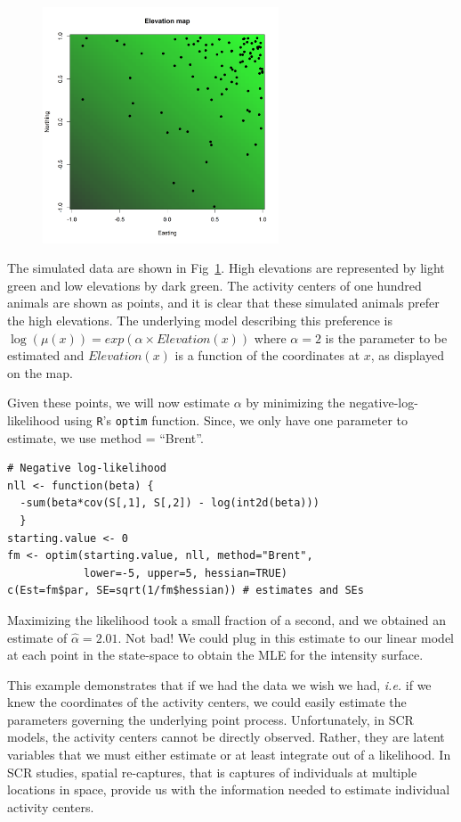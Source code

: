 \begin{figure}
\centering
\includegraphics[width=7cm,height=7cm]{figs/elevMap}
\label{fig:elevMap}
\end{figure}

The simulated data are shown in Fig~\ref{fig:elevMap}. High elevations
are represented by light green and low elevations by dark green. The
activity centers of one hundred animals are shown as
points, and it is clear that these simulated animals prefer the high
elevations.  The underlying model describing this preference is
$\log(\mu(x)) = exp(\alpha \times Elevation(x))$
where $\alpha=2$ is the parameter to be estimated and $Elevation(x)$
is a function of the coordinates at $x$, as displayed on the map.

Given these points, we will now estimate $\alpha$ by minimizing the
negative-log-likelihood using \verb+R+'s \verb+optim+ function. Since,
we only have one parameter to estimate, we use method = ``Brent''.

\begin{small}
\begin{verbatim}
# Negative log-likelihood
nll <- function(beta) {
  -sum(beta*cov(S[,1], S[,2]) - log(int2d(beta)))
  }
starting.value <- 0
fm <- optim(starting.value, nll, method="Brent",
            lower=-5, upper=5, hessian=TRUE)
c(Est=fm$par, SE=sqrt(1/fm$hessian)) # estimates and SEs
\end{verbatim}
\end{small}


Maximizing the likelihood took a small fraction of a second, and we
obtained an estimate of $\hat{\alpha}=2.01$. Not bad! We could plug in
this estimate to our linear model at each point in the state-space to
obtain the MLE for the intensity surface.

This example demonstrates
that if we had the data we wish we had, {\it i.e.} if we knew the
coordinates of the activity centers, we could easily estimate the
parameters governing the underlying point process. Unfortunately, in
SCR models, the activity centers cannot be directly observed. Rather,
they are latent variables that we must either estimate or at least integrate out
of a likelihood. In SCR studies, spatial re-captures, that is captures
of individuals at
multiple locations in space, provide us with the information needed to
estimate individual activity centers.

